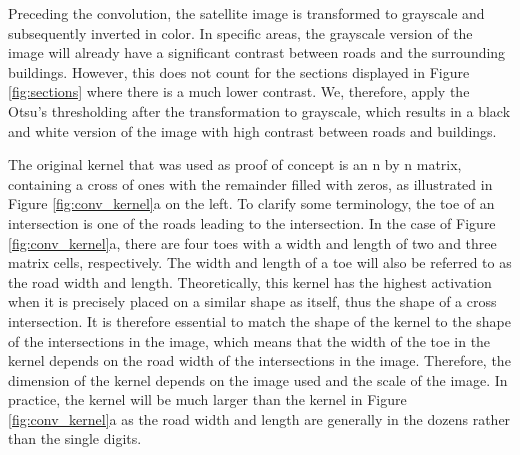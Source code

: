 Preceding the convolution, the satellite image is transformed to grayscale and subsequently inverted in color. In specific areas, the grayscale version of the image will already have a significant contrast between roads and the surrounding buildings. However, this does not count for the sections displayed in Figure \ref{fig:sections} where there is a much lower contrast. We, therefore, apply the Otsu's thresholding after the transformation to grayscale, which results in a black and white version of the image with high contrast between roads and buildings. 

The original kernel that was used as proof of concept is an n by n matrix, containing a cross of ones
with the remainder filled with zeros, as illustrated in Figure \ref{fig:conv_kernel}a on the left. To clarify some terminology, the toe of an intersection is one of the roads leading to the
intersection. In the case of Figure \ref{fig:conv_kernel}a, there are four toes
with a width and length of two and three matrix cells, respectively. The width and length of a toe will also be referred to as the road width and length. Theoretically, this kernel has the highest activation when it is precisely placed on a similar shape as itself, thus the shape of a cross intersection. It is therefore essential to match the shape of the kernel to the shape of the intersections in the image, which means that the width of the toe in the kernel depends on the road width of the intersections in the image. Therefore, the dimension of the kernel depends on the image used and the scale of the image. In practice, the kernel will be much larger than the kernel in Figure \ref{fig:conv_kernel}a as the road width and length are generally in the dozens rather than the single digits.

